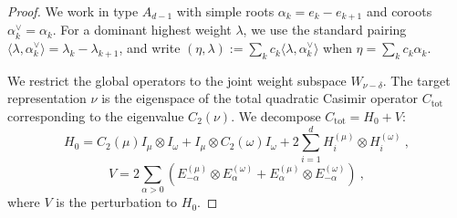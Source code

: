 \documentclass[11pt,letterpaper]{article}
\begin{document}
\begin{proof}
We work in type $A_{d-1}$ with simple roots $\alpha_k = e_k - e_{k+1}$ and coroots $\alpha_k^\vee = \alpha_k$. For a dominant highest weight $\lambda$, we use the standard pairing $\langle \lambda, \alpha_k^\vee \rangle = \lambda_k - \lambda_{k+1}$, and write $(\eta, \lambda) := \sum_k c_k \langle \lambda, \alpha_k^\vee \rangle$ when $\eta = \sum_k c_k \alpha_k$.

We restrict the global operators to the joint weight subspace $W_{\nu-\delta}$. The target representation $\nu$ is the eigenspace of the total quadratic Casimir operator $C_{\mathrm{tot}}$ corresponding to the eigenvalue $C_2(\nu)$. We decompose $C_{\mathrm{tot}} = H_0 + V$:
\begin{equation}
    H_0 = C_2(\mu)I_\mu \otimes I_\omega + I_\mu \otimes C_2(\omega) I_\omega + 2 \sum_{i=1}^d H_i^{(\mu)} \otimes H_i^{(\omega)} \ ,
\end{equation}
\begin{equation}
    V = 2 \sum_{\alpha > 0} \left( E_{-\alpha}^{(\mu)} \otimes E_\alpha^{(\omega)} + E_\alpha^{(\mu)} \otimes E_{-\alpha}^{(\omega)} \right) \ ,
\end{equation}
where $V$ is the perturbation to $H_0$. 


\end{proof}
\end{document}
